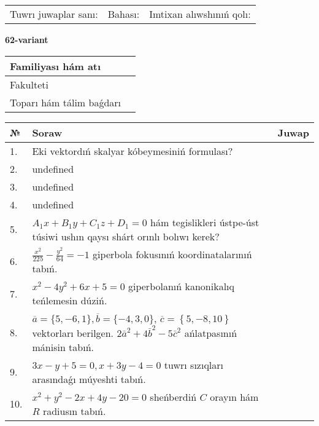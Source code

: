 \documentclass{article}
\begin{document}
\vspace{0.7cm}

\begin{tabular}{lll}
Tuwrı juwaplar sanı: \underline{\hspace{1cm}} & 
Bahası: \underline{\hspace{1cm}} & 
Imtixan alıwshınıń qolı: \underline{\hspace{2cm}} \\
\end{tabular}

\egroup

\newpage


\textbf{62-variant}\\

\bgroup
\def\arraystretch{1.6} %

\begin{tabular}{|m{5.7cm}|m{9.5cm}|}
\hline
Familiyası hám atı & \\
\hline
Fakulteti  & \\
\hline
Toparı hám tálim baǵdarı  & \\
\hline
\end{tabular}

\vspace{0.7cm}

\begin{tabular}{|m{0.7cm}|m{10cm}|m{4cm}|}
\hline
№ & Soraw & Juwap \\
\hline
1. & Eki vektordıń skalyar kóbeymesiniń formulası? &  \\
\hline
2. & undefined &  \\
\hline
3. & undefined &  \\
\hline
4. & undefined &  \\
\hline
5. & \(A_{1}x + B_{1}y + C_{1}z + D_{1} = 0\) hám tegislikleri ústpe-úst túsiwi ushın qaysı shárt orınlı bolıwı kerek? &  \\
\hline
6. & \(\frac{x^{2}}{225} - \frac{y^{2}}{64} = - 1\) giperbola fokusınıń koordinatalarınıń tabıń. &  \\
\hline
7. & \(x^{2} - 4 y^{2} + 6 x + 5 = 0\) giperbolanıń kanonikalıq teńlemesin dúziń. &  \\
\hline
8. & \(\overline{a} = \{5,- 6, 1 \}, \overline{b} = \{ - 4, 3, 0 \} \), \(\overline{c} = \left\{ 5,- 8, 10 \right\}\) vektorları berilgen. \(2{\bar{a}}^{2} + 4{\bar{b}}^{2} - 5{\bar{c}}^{2}\) ańlatpasınıń mánisin tabıń. &  \\
\hline
9. & \(3 x - y + 5 = 0, x + 3 y - 4 = 0\) tuwrı sızıqları arasındaǵı múyeshti tabıń. &  \\
\hline
10. & \(x^{2} + y^{2} - 2 x + 4 y - 20 = 0\) sheńberdiń \(C\) orayın hám \(R\) radiusın tabıń. & \\
\hline
\end{tabular}
\end{document}
